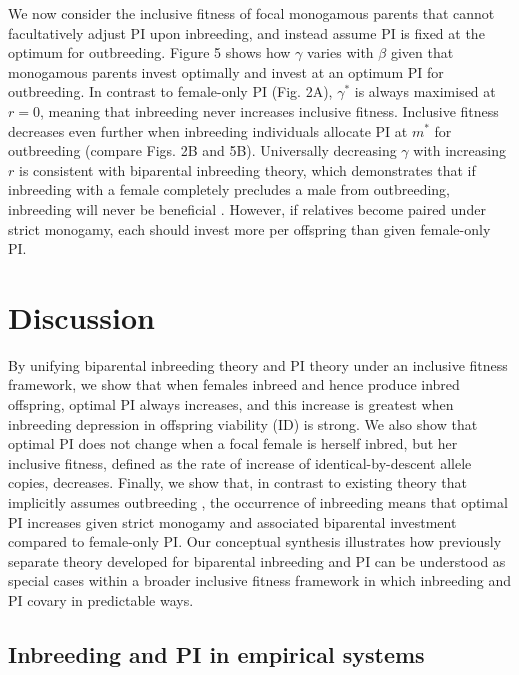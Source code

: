 \documentclass[12pt]{article}
\begin{document}
We now consider the inclusive fitness of focal monogamous parents that cannot facultatively adjust PI upon inbreeding, and instead assume PI is fixed at the optimum for outbreeding. Figure 5 shows how $\gamma$ varies with $\beta$ given that monogamous parents invest optimally and invest at an optimum PI for outbreeding. In contrast to female-only PI (Fig. 2A), $\gamma^{*}$ is always maximised at $r=0$, meaning that inbreeding never increases inclusive fitness. Inclusive fitness decreases even further when inbreeding individuals allocate PI at $m^{*}$ for outbreeding (compare Figs. 2B and 5B). Universally decreasing $\gamma$ with increasing $r$ is consistent with biparental inbreeding theory, which demonstrates that if inbreeding with a female completely precludes a male from outbreeding, inbreeding will never be beneficial \cite[][]{Waser1986, Duthie2015a}. However, if relatives become paired under strict monogamy, each should invest more per offspring than given female-only PI.

\section*{Discussion}

By unifying biparental inbreeding theory and PI theory under an inclusive fitness framework, we show that when females inbreed and hence produce inbred offspring, optimal PI always increases, and this increase is greatest when inbreeding depression in offspring viability (ID) is strong. We also show that optimal PI does not change when a focal female is herself inbred, but her inclusive fitness, defined as the rate of increase of identical-by-descent allele copies, decreases. Finally, we show that, in contrast to existing theory that implicitly assumes outbreeding \cite[][]{Parker1985}, the occurrence of inbreeding means that optimal PI increases given strict monogamy and associated biparental investment compared to female-only PI. Our conceptual synthesis illustrates how previously separate theory developed for biparental inbreeding \cite[][]{Parker1979, Parker2006} and PI \cite[][]{Macnair1978, Parker1978} can be understood as special cases within a broader inclusive fitness framework in which inbreeding and PI covary in predictable ways.

\subsection*{Inbreeding and PI in empirical systems}
\end{document}
